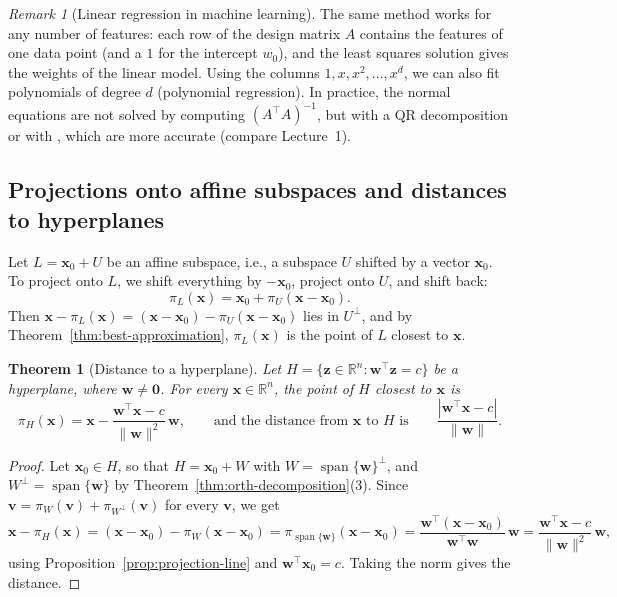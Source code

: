 \documentclass[11pt]{article}
\newcommand{\py}[1]{\texttt{\detokenize{#1}}}
\newcommand{\norm}[1]{\lVert #1 \rVert}
\theoremstyle{definition}
\theoremstyle{plain}
\newtheorem{theorem}[definition]{Theorem}
\theoremstyle{remark}
\newtheorem{remark}[definition]{Remark}
\DeclareMathOperator{\Span}{span}
\begin{document}
\begin{remark}[Linear regression in machine learning]
    The same method works for any number of features: each row of the design matrix $A$ contains the features of one data point (and a $1$ for the intercept $w_0$), and the least squares solution gives the weights of the linear model. Using the columns $1, x, x^2, \ldots, x^d$, we can also fit polynomials of degree $d$ (polynomial regression). In practice, the normal equations are not solved by computing $(A^\top A)^{-1}$, but with a QR decomposition or with \py{np.linalg.lstsq}, which are more accurate (compare Lecture~1).
\end{remark}

\subsection{Projections onto affine subspaces and distances to hyperplanes}\label{sec:affine}

Let $L = \mathbf{x}_0 + U$ be an affine subspace, i.e., a subspace $U$ shifted by a vector $\mathbf{x}_0$. To project onto $L$, we shift everything by $-\mathbf{x}_0$, project onto $U$, and shift back:
\[\pi_L(\mathbf{x}) = \mathbf{x}_0 + \pi_U(\mathbf{x} - \mathbf{x}_0).\]
Then $\mathbf{x} - \pi_L(\mathbf{x}) = (\mathbf{x} - \mathbf{x}_0) - \pi_U(\mathbf{x} - \mathbf{x}_0)$ lies in $U^\perp$, and by Theorem~\ref{thm:best-approximation}, $\pi_L(\mathbf{x})$ is the point of $L$ closest to $\mathbf{x}$.

\begin{theorem}[Distance to a hyperplane]\label{thm:distance-hyperplane}
    Let $H = \{\mathbf{z} \in \mathbb{R}^n : \mathbf{w}^\top \mathbf{z} = c\}$ be a hyperplane, where $\mathbf{w} \neq \mathbf{0}$. For every $\mathbf{x} \in \mathbb{R}^n$, the point of $H$ closest to $\mathbf{x}$ is
    \[\pi_H(\mathbf{x}) = \mathbf{x} - \frac{\mathbf{w}^\top \mathbf{x} - c}{\norm{\mathbf{w}}^2}\, \mathbf{w}, \qquad \text{and the distance from } \mathbf{x} \text{ to } H \text{ is} \qquad \frac{|\mathbf{w}^\top \mathbf{x} - c|}{\norm{\mathbf{w}}}.\]
\end{theorem}

\begin{proof}
    Let $\mathbf{x}_0 \in H$, so that $H = \mathbf{x}_0 + W$ with $W = \Span\{\mathbf{w}\}^\perp$, and $W^\perp = \Span\{\mathbf{w}\}$ by Theorem~\ref{thm:orth-decomposition}(3). Since $\mathbf{v} = \pi_W(\mathbf{v}) + \pi_{W^\perp}(\mathbf{v})$ for every $\mathbf{v}$, we get
    \[\mathbf{x} - \pi_H(\mathbf{x}) = (\mathbf{x} - \mathbf{x}_0) - \pi_W(\mathbf{x} - \mathbf{x}_0) = \pi_{\Span\{\mathbf{w}\}}(\mathbf{x} - \mathbf{x}_0) = \frac{\mathbf{w}^\top (\mathbf{x} - \mathbf{x}_0)}{\mathbf{w}^\top \mathbf{w}}\, \mathbf{w} = \frac{\mathbf{w}^\top \mathbf{x} - c}{\norm{\mathbf{w}}^2}\, \mathbf{w},\]
    using Proposition~\ref{prop:projection-line} and $\mathbf{w}^\top \mathbf{x}_0 = c$. Taking the norm gives the distance.
\end{proof}
\end{document}
